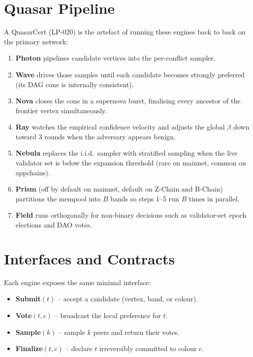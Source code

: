 \section{Quasar Pipeline}

A QuasarCert (LP-020) is the artefact of running these engines back to
back on the primary network:

\begin{enumerate}[nosep]
\item \textbf{Photon} pipelines candidate vertices into the per-conflict
sampler.
\item \textbf{Wave} drives those samples until each candidate becomes
strongly preferred (its DAG cone is internally consistent).
\item \textbf{Nova} closes the cone in a supernova burst, finalising
every ancestor of the frontier vertex simultaneously.
\item \textbf{Ray} watches the empirical confidence velocity and
adjusts the global $\beta$ down toward 3 rounds when the adversary
appears benign.
\item \textbf{Nebula} replaces the i.i.d.\ sampler with stratified
sampling when the live validator set is below the expansion threshold
(rare on mainnet, common on appchains).
\item \textbf{Prism} (off by default on mainnet, default on Z-Chain and
B-Chain) partitions the mempool into $B$ bands so steps 1--5 run $B$
times in parallel.
\item \textbf{Field} runs orthogonally for non-binary decisions such as
validator-set epoch elections and DAO votes.
\end{enumerate}

\section{Interfaces and Contracts}

Each engine exposes the same minimal interface:

\begin{itemize}[nosep]
\item \textbf{Submit}$(t)$ -- accept a candidate (vertex, band, or colour).
\item \textbf{Vote}$(t, c)$ -- broadcast the local preference for $t$.
\item \textbf{Sample}$(k)$ -- sample $k$ peers and return their votes.
\item \textbf{Finalize}$(t, c)$ -- declare $t$ irreversibly committed to
colour $c$.
\end{itemize}

